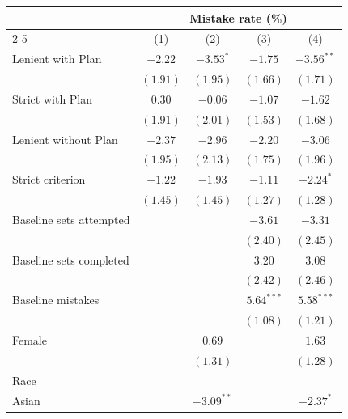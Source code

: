 \begin{tabular}{l c c c c}
\toprule
 & \multicolumn{4}{c}{Mistake rate (\%)} \\
\cmidrule(lr){2-5}
 & (1) & (2) & (3) & (4) \\
\midrule
Lenient with Plan        & $-2.22$      & $-3.53^{*}$   & $-1.75$      & $-3.56^{**}$  \\
                         & $(1.91)$     & $(1.95)$      & $(1.66)$     & $(1.71)$      \\
Strict with Plan         & $0.30$       & $-0.06$       & $-1.07$      & $-1.62$       \\
                         & $(1.91)$     & $(2.01)$      & $(1.53)$     & $(1.68)$      \\
Lenient without Plan     & $-2.37$      & $-2.96$       & $-2.20$      & $-3.06$       \\
                         & $(1.95)$     & $(2.13)$      & $(1.75)$     & $(1.96)$      \\
Strict criterion         & $-1.22$      & $-1.93$       & $-1.11$      & $-2.24^{*}$   \\
                         & $(1.45)$     & $(1.45)$      & $(1.27)$     & $(1.28)$      \\
Baseline sets attempted  &              &               & $-3.61$      & $-3.31$       \\
                         &              &               & $(2.40)$     & $(2.45)$      \\
Baseline sets completed  &              &               & $3.20$       & $3.08$        \\
                         &              &               & $(2.42)$     & $(2.46)$      \\
Baseline mistakes        &              &               & $5.64^{***}$ & $5.58^{***}$  \\
                         &              &               & $(1.08)$     & $(1.21)$      \\
Female                   &              & $0.69$        &              & $1.63$        \\
                         &              & $(1.31)$      &              & $(1.28)$      \\
Race                     &              &               &              &               \\
\quad Asian              &              & $-3.09^{**}$  &              & $-2.37^{*}$   \\

\end{tabular}
